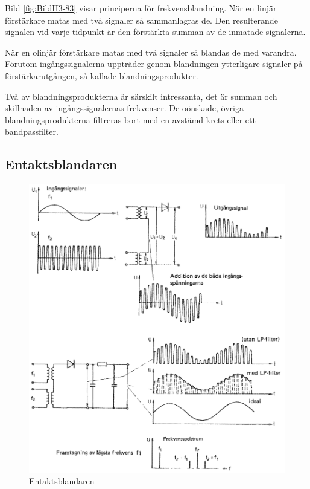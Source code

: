 Bild \ref{fig:BildII3-83} visar principerna för frekvensblandning.
När en linjär förstärkare matas med två signaler så sammanlagras de.
Den resulterande signalen vid varje tidpunkt är den förstärkta summan av de
inmatade signalerna.

När en olinjär förstärkare matas med två signaler så blandas de med varandra.
Förutom ingångssignalerna uppträder genom blandningen ytterligare signaler på
förstärkarutgången, så kallade blandningsprodukter.

Två av blandningsprodukterna är särskilt intressanta, det är summan och
skillnaden av ingångssignalernas frekvenser.
De oönskade, övriga blandningsprodukterna filtreras bort med en avstämd krets
eller ett bandpassfilter.

\subsection{Entaktsblandaren}

\begin{figure}
\includegraphics[width=\textwidth]{images/cropped_pdfs/bild_2_3-84a.pdf}
\caption{Entaktsblandaren}
\label{fig:BildII3-84a}
\end{figure}

